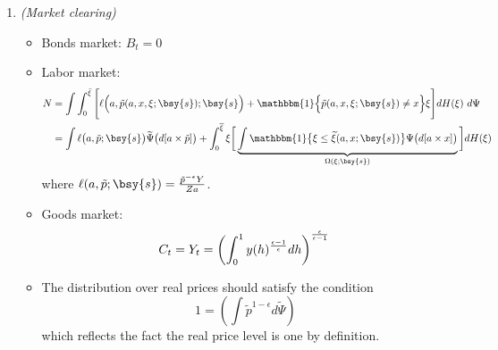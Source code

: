 \documentclass[a4paper,10pt]{article}  %
\begin{document}
\begin{equil}
\begin{enumerate}
   \item \emph{(Market clearing)}
   \begin{itemize}[leftmargin = 0.1in, label=\raisebox{0.5ex}{\tiny$\bullet$}] 
      \item Bonds market: $ B_t = 0 $ %
      \item Labor market:
      \begin{equation}
         \label{eq:labor_market}
         \begin{split}
            N & = 
            \int \int_0^{ \bar{\xi} }
            \Bigg[ 
               \ell \Big(a, \tilde{p}(a,x,\xi; \bsy{s} ) ; \bsy{s}\Big) + 
               \mathbbm{1} \Big\{ \tilde{p}(a,x,\xi; \bsy{s} ) \ne x \Big\} \xi
            \Bigg]
            dH( \xi ) \ d\Psi \\           
            & = \int \ell\big( a,\tilde{p}; \bsy{s} \big) \widetilde{\Psi}\big( d[a \times \tilde{p}] \big) + 
            \int_0^{ \overline{\xi} } \xi 
            \bigg[ 
               \underbrace{\int \mathbbm{1} \big\{ \xi \le \widetilde{\xi}( a,x;\bsy{s} ) \big\} \Psi\big(d[ a \times x ] \big) }_{ \Omega(\xi; \bsy{s} ) }
            \bigg]
            dH(\xi)
         \end{split}
      \end{equation}
      where $ \ell(a,\tilde{p}; \bsy{s} ) = \frac{ \tilde{p}^{-\epsilon} Y }{ Z a } $. 

      \item Goods market:
      \begin{equation}
         \label{eq:goods_market}
         C_t = Y_t = \left( \int_0^1 y(h)^{ \frac{\epsilon-1}{\epsilon} } dh \right)^{ \frac{\epsilon}{\epsilon-1} } \\
      \end{equation}

      \item The distribution over real prices should satisfy the condition
      \begin{equation}
         \label{eq:consistency_prices}
         1 = \left( \int \tilde{p}^{1-\epsilon} d\widetilde{\Psi} \right)
      \end{equation}
      which reflects the fact the real price level is one by definition.
   \end{itemize}


\end{enumerate}
\end{equil}
\end{document}
